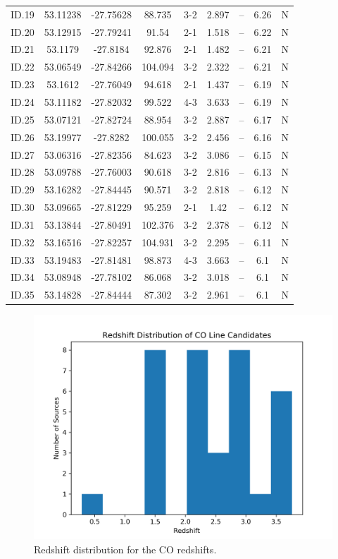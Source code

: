 \begin{table}
\begin{tabular}{ccccccccc}
ID.19 & 53.11238 & -27.75628 & 88.735 & 3-2 & 2.897 & -- & 6.26 & N \\
ID.20 & 53.12915 & -27.79241 & 91.54 & 2-1 & 1.518 & -- & 6.22 & N \\
ID.21 & 53.1179 & -27.8184 & 92.876 & 2-1 & 1.482 & -- & 6.21 & N \\
ID.22 & 53.06549 & -27.84266 & 104.094 & 3-2 & 2.322 & -- & 6.21 & N \\
ID.23 & 53.1612 & -27.76049 & 94.618 & 2-1 & 1.437 & -- & 6.19 & N \\
ID.24 & 53.11182 & -27.82032 & 99.522 & 4-3 & 3.633 & -- & 6.19 & N \\
ID.25 & 53.07121 & -27.82724 & 88.954 & 3-2 & 2.887 & -- & 6.17 & N \\
ID.26 & 53.19977 & -27.8282 & 100.055 & 3-2 & 2.456 & -- & 6.16 & N \\
ID.27 & 53.06316 & -27.82356 & 84.623 & 3-2 & 3.086 & -- & 6.15 & N \\
ID.28 & 53.09788 & -27.76003 & 90.618 & 3-2 & 2.816 & -- & 6.13 & N \\
ID.29 & 53.16282 & -27.84445 & 90.571 & 3-2 & 2.818 & -- & 6.12 & N \\
ID.30 & 53.09665 & -27.81229 & 95.259 & 2-1 & 1.42 & -- & 6.12 & N \\
ID.31 & 53.13844 & -27.80491 & 102.376 & 3-2 & 2.378 & -- & 6.12 & N \\
ID.32 & 53.16516 & -27.82257 & 104.931 & 3-2 & 2.295 & -- & 6.11 & N \\
ID.33 & 53.19483 & -27.81481 & 98.873 & 4-3 & 3.663 & -- & 6.1 & N \\
ID.34 & 53.08948 & -27.78102 & 86.068 & 3-2 & 3.018 & -- & 6.1 & N \\
ID.35 & 53.14828 & -27.84444 & 87.302 & 3-2 & 2.961 & -- & 6.1 & N \\
\end{tabular}
\end{table}\label{table:Catalog}

\begin{figure}[tbp]
\centering \includegraphics[width=120mm]{Survey/redshift_catalog.png}
\caption{Redshift distribution for the CO redshifts.}
\label{fig:cat_red}
\end{figure}

